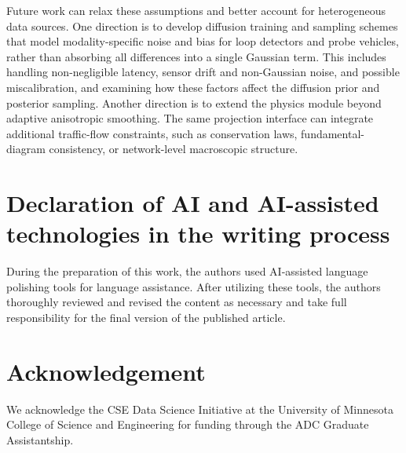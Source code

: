 \documentclass[a4paper,fleqn]{cas-sc}
\numberwithin{equation}{section}
\begin{document}
Future work can relax these assumptions and better account for heterogeneous data sources. One direction is to develop diffusion training and sampling schemes that model modality-specific noise and bias for loop detectors and probe vehicles, rather than absorbing all differences into a single Gaussian term. This includes handling non-negligible latency, sensor drift and non-Gaussian noise, and possible miscalibration, and examining how these factors affect the diffusion prior and posterior sampling. Another direction is to extend the physics module beyond adaptive anisotropic smoothing. The same projection interface can integrate additional traffic-flow constraints, such as conservation laws, fundamental-diagram consistency, or network-level macroscopic structure. 


\section*{Declaration of AI and AI-assisted technologies in the writing process}
During the preparation of this work, the authors used AI-assisted language polishing tools for language assistance. After utilizing these tools, the authors thoroughly reviewed and revised the content as necessary and take full responsibility for the final version of the published article.

\section*{Acknowledgement}
We acknowledge the CSE Data Science Initiative at the University of Minnesota College of Science and Engineering for funding through the ADC Graduate Assistantship.

\printcredits



\end{document}
